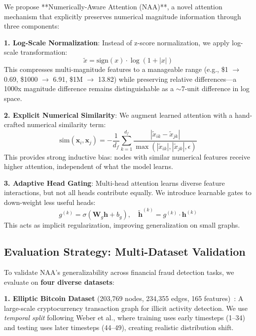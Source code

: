 We propose **Numerically-Aware Attention (NAA)**, a novel attention mechanism that explicitly preserves numerical magnitude information through three components:

\textbf{1. Log-Scale Normalization}: Instead of z-score normalization, we apply log-scale transformation:
\begin{equation}
\tilde{x} = \text{sign}(x) \cdot \log(1 + |x|)
\end{equation}
This compresses multi-magnitude features to a manageable range (e.g., \$1 $\to$ 0.69, \$1000 $\to$ 6.91, \$1M $\to$ 13.82) while preserving relative differences---a 1000x magnitude difference remains distinguishable as a $\sim$7-unit difference in log space.

\textbf{2. Explicit Numerical Similarity}: We augment learned attention with a hand-crafted numerical similarity term:
\begin{equation}
\text{sim}(\mathbf{x}_i, \mathbf{x}_j) = -\frac{1}{d_f} \sum_{k=1}^{d_f} \frac{|\tilde{x}_{ik} - \tilde{x}_{jk}|}{\max(|\tilde{x}_{ik}|, |\tilde{x}_{jk}|, \epsilon)}
\end{equation}
This provides strong inductive bias: nodes with similar numerical features receive higher attention, independent of what the model learns.

\textbf{3. Adaptive Head Gating}: Multi-head attention learns diverse feature interactions, but not all heads contribute equally. We introduce learnable gates to down-weight less useful heads:
\begin{equation}
g^{(k)} = \sigma(\mathbf{W}_g \mathbf{h} + b_g), \quad \tilde{\mathbf{h}}^{(k)} = g^{(k)} \cdot \mathbf{h}^{(k)}
\end{equation}
This acts as implicit regularization, improving generalization on small graphs.

\subsection{Evaluation Strategy: Multi-Dataset Validation}

To validate NAA's generalizability across financial fraud detection tasks, we evaluate on \textbf{four diverse datasets}:

\textbf{1. Elliptic Bitcoin Dataset} (203,769 nodes, 234,355 edges, 165 features)~\cite{weber2019anti}: A large-scale cryptocurrency transaction graph for illicit activity detection. We use \textit{temporal split} following Weber et al., where training uses early timesteps (1--34) and testing uses later timesteps (44--49), creating realistic distribution shift.

